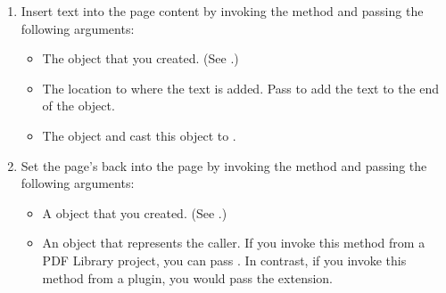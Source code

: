 \documentclass[letterpaper,12pt,english,openany,oneside]{sphinxmanual}
\begin{document}
\begin{enumerate}
%
\setcounter{enumi}{2}
\item {} 
Insert text into the page content by invoking the  method and passing the following arguments:
\begin{itemize}
\item {} 
The  object that you created. (See .)

\item {} 
The location to where the text is added. Pass  to add the text to the end of the  object.

\item {} 
The  object and cast this object to .

\end{itemize}

\item {} 
Set the page’s  back into the page by invoking the  method and passing the following arguments:
\begin{itemize}
\item {} 
A  object that you created. (See .)

\item {} 
An  object that represents the caller. If you invoke this method from a PDF Library project, you can pass . In contrast, if you invoke this method from a plugin, you would pass the  extension.

\end{itemize}

\end{enumerate}
\end{document}
